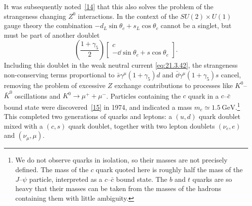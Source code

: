 It was subsequently noted~\hyperref[ch21-ref-14]{[14]} that this also solves the problem of the strangeness changing $Z^0$ interactions. In the context of the $SU(2)\times U(1)$ gauge theory the combination $-d_L\sin\theta_c+s_L\cos\theta_c$ cannot be a singlet, but must be part of another doublet
\begin{equation}
\left(\frac{1+\gamma_5}{2}\right)
\begin{bmatrix}
c\\
-\dd\sin\theta_c+s\cos\theta_c
\end{bmatrix}.
\tag{21.3.44}\label{eq:21.3.44}
\end{equation}
Including this doublet in the weak neutral current \eqref{eq:21.3.42}, the strangeness non-conserving terms proportional to $\bar s\gamma^\mu(1+\gamma_5)d$ and $\bar \dd\gamma^\mu(1+\gamma_5)s$ cancel, removing the problem of excessive $Z$ exchange contributions to processes like $K^0$--$\bar K^0$ oscillations and $K^0\to\mu^++\mu^-$. Particles containing the $c$ quark in a $c$--$\bar c$ bound state were discovered~\hyperref[ch21-ref-15]{[15]} in 1974, and indicated a mass $m_c\simeq1.5\ \mathrm{GeV}$.\footnote{We do not observe quarks in isolation, so their masses are not precisely defined. The mass of the $c$ quark quoted here is roughly half the mass of the $J$--$\psi$ particle, interpreted as a $c$--$\bar c$ bound state. The $b$ and $t$ quarks are so heavy that their masses can be taken from the masses of the hadrons containing them with little ambiguity.} This completed two generations of quarks and leptons: a $(u,d)$ quark doublet mixed with a $(c,s)$ quark doublet, together with two lepton doublets $(\nu_e,e)$ and $(\nu_\mu,\mu)$.

